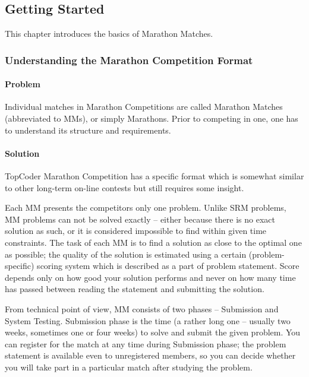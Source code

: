 \documentclass[]{article}
\date{}
\let\oldparagraph\paragraph
\renewcommand{\paragraph}[1]{\oldparagraph{#1}\mbox{}}
\begin{document}
\hypertarget{getting-started}{%
\subsection{Getting Started}\label{getting-started}}

This chapter introduces the basics of Marathon Matches.

\hypertarget{understanding-the-marathon-competition-format}{%
\subsubsection{Understanding the Marathon Competition
Format}\label{understanding-the-marathon-competition-format}}

\hypertarget{problem}{%
\paragraph{Problem}\label{problem}}

Individual matches in Marathon Competitions are called Marathon Matches
(abbreviated to MMs), or simply Marathons. Prior to competing in one,
one has to understand its structure and requirements.

\hypertarget{solution}{%
\paragraph{Solution}\label{solution}}

TopCoder Marathon Competition has a specific format which is somewhat
similar to other long-term on-line contests but still requires some
insight.

Each MM presents the competitors only one problem. Unlike SRM problems,
MM problems can not be solved exactly -- either because there is no
exact solution as such, or it is considered impossible to find within
given time constraints. The task of each MM is to find a solution as
close to the optimal one as possible; the quality of the solution is
estimated using a certain (problem-specific) scoring system which is
described as a part of problem statement. Score depends only on how good
your solution performs and never on how many time has passed between
reading the statement and submitting the solution.

From technical point of view, MM consists of two phases -- Submission
and System Testing. Submission phase is the time (a rather long one --
usually two weeks, sometimes one or four weeks) to solve and submit the
given problem. You can register for the match at any time during
Submission phase; the problem statement is available even to
unregistered members, so you can decide whether you will take part in a
particular match after studying the problem.
\end{document}
